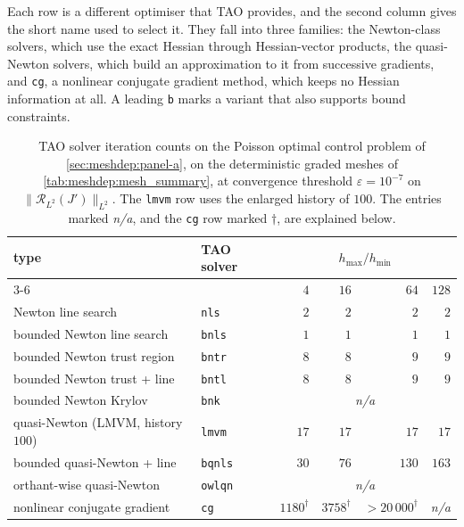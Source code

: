\documentclass[a4paper,11pt]{article}
\newcommand{\Rmap}{\mathcal{R}}              %
\theoremstyle{spacedplain} \newtheorem{theorem}[counter]{Theorem} \newtheorem{lemma}[counter]{Lemma} \newtheorem{prop}[counter]{Proposition} \newtheorem{cor}[counter]{Corollary}
\theoremstyle{spaceddefinition} \newtheorem{defn}[counter]{Definition} \newtheorem{example}[counter]{Example} \newtheorem{remark}[counter]{Remark}
\begin{document}
Each row is a different optimiser that TAO provides, and the second column gives the short name used to select it. They fall into three families: the Newton-class solvers, which use the exact Hessian through Hessian-vector products, the quasi-Newton solvers, which build an approximation to it from successive gradients, and \texttt{cg}, a nonlinear conjugate gradient method, which keeps no Hessian information at all. A leading \texttt{b} marks a variant that also supports bound constraints.

\begin{table}[H]
  \centering
  \setlength{\tabcolsep}{10pt}
  \begin{tabular}{l l r r r r}
    \toprule
    type & TAO solver
       & \multicolumn{4}{c}{$h_{\max} / h_{\min}$} \\
    \cmidrule(lr){3-6}
       & & $4$ & $16$ & $64$ & $128$ \\
    \midrule
    Newton line search                & \texttt{nls}   & $2$ & $2$ & $2$ & $2$ \\
    bounded Newton line search        & \texttt{bnls}  & $1$ & $1$ & $1$ & $1$ \\
    bounded Newton trust region       & \texttt{bntr}  & $8$ & $8$ & $9$ & $9$ \\
    bounded Newton trust + line       & \texttt{bntl}  & $8$ & $8$ & $9$ & $9$ \\
    bounded Newton Krylov             & \texttt{bnk}   & \multicolumn{4}{c}{\textit{n/a}} \\
    quasi-Newton (LMVM, history $100$) & \texttt{lmvm}  & $17$ & $17$ & $17$ & $17$ \\
    bounded quasi-Newton + line       & \texttt{bqnls} & $30$ & $76$ & $130$ & $163$ \\
    orthant-wise quasi-Newton         & \texttt{owlqn} & \multicolumn{4}{c}{\textit{n/a}} \\
    nonlinear conjugate gradient      & \texttt{cg}    & $1180^{\dagger}$ & $3758^{\dagger}$ & $> 20\,000^{\dagger}$ & \textit{n/a} \\
    \bottomrule
  \end{tabular}
  \caption{TAO solver iteration counts on the Poisson optimal control problem of \cref{sec:meshdep:panel-a}, on the deterministic graded meshes of \cref{tab:meshdep:mesh_summary}, at convergence threshold $\varepsilon = 10^{-7}$ on $\|\Rmap_{L^{2}}(J')\|_{L^{2}}$. The \texttt{lmvm} row uses the enlarged history of $100$. The entries marked \textit{n/a}, and the \texttt{cg} row marked $\dagger$, are explained below.}
  \label{tab:meshdep:tao-zoo}
\end{table}
\end{document}
